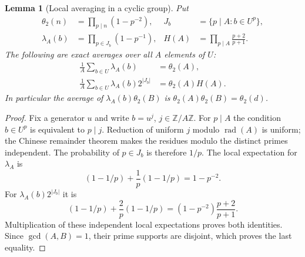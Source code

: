 \documentclass[11pt]{article}
\newtheorem*{auxlemma}{Lemma}
\begin{document}
\begin{auxlemma}[Local averaging in a cyclic group]
Put
\[
 \begin{aligned}
 \theta_2(n)&=\prod_{p\mid n}(1-p^{-2}),&
 J_b&=\{p\mid A:b\in U^p\},\\
 \lambda_A(b)&=\prod_{p\in J_b}(1-p^{-1}),&
 H(A)&=\prod_{p\mid A}\frac{p+2}{p+1}.
 \end{aligned}
\]
The following are exact averages over all $A$ elements of $U$:
\begin{equation}\label{eq:inner-local-averages}
 \begin{aligned}
  \frac1A\sum_{b\in U}\lambda_A(b)&=\theta_2(A),\\
  \frac1A\sum_{b\in U}\lambda_A(b)2^{|J_b|}
       &=\theta_2(A)H(A).
 \end{aligned}
\end{equation}
In particular the average of $\lambda_A(b)\theta_2(B)$ is
$\theta_2(A)\theta_2(B)=\theta_2(d)$.
\end{auxlemma}
\begin{proof}
Fix a generator $u$ and write $b=u^j$, $j\in\mathbb Z/A\mathbb Z$.
For $p\mid A$ the condition $b\in U^p$ is equivalent to $p\mid j$.
Reduction of uniform $j$ modulo $\operatorname{rad}(A)$ is uniform;
the Chinese remainder theorem makes the residues modulo the distinct
primes independent. The probability of $p\in J_b$ is therefore $1/p$.
The local expectation for $\lambda_A$ is
\[
 (1-1/p)+\frac1p(1-1/p)=1-p^{-2}.
\]
For $\lambda_A(b)2^{|J_b|}$ it is
\[
 (1-1/p)+\frac2p(1-1/p)
       =(1-p^{-2})\frac{p+2}{p+1}.
\]
Multiplication of these independent local expectations proves both
identities. Since $\gcd(A,B)=1$, their prime supports are disjoint,
which proves the last equality.
\end{proof}
\end{document}
